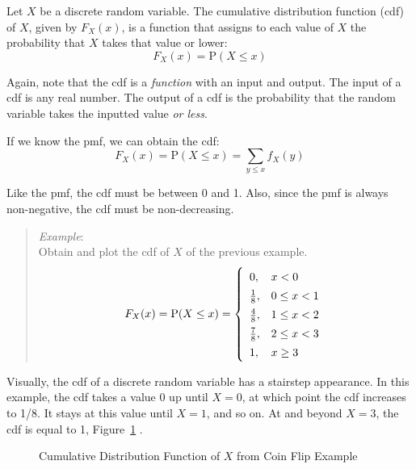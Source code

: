 \documentclass[
  letterpaper,
  DIV=11,
  numbers=noendperiod]{scrreprt}
\begin{document}
Let \(X\) be a discrete random variable. The cumulative distribution
function (cdf) of \(X\), given by \(F_X(x)\), is a function that assigns
to each value of \(X\) the probability that \(X\) takes that value or
lower: \[
F_X(x)=\mbox{P}(X\leq x)
\]

Again, note that the cdf is a \emph{function} with an input and output.
The input of a cdf is any real number. The output of a cdf is the
probability that the random variable takes the inputted value \emph{or
less}.

If we know the pmf, we can obtain the cdf: \[
F_X(x)=\mbox{P}(X\leq x)=\sum_{y\leq x} f_X(y)
\]

Like the pmf, the cdf must be between 0 and 1. Also, since the pmf is
always non-negative, the cdf must be non-decreasing.

\begin{quote}
\emph{Example}:\\
Obtain and plot the cdf of \(X\) of the previous example. \[
F_X(x)=\mbox{P}(X\leq x)=\left\{\renewcommand{\arraystretch}{1.4} \begin{array}{ll} 0, & x <0 \\
\frac{1}{8}, & 0\leq x < 1 \\
\frac{4}{8}, & 1\leq x < 2 \\
\frac{7}{8}, & 2\leq x < 3 \\
1, & x\geq 3 \end{array}\right .
\]
\end{quote}

Visually, the cdf of a discrete random variable has a stairstep
appearance. In this example, the cdf takes a value 0 up until \(X=0\),
at which point the cdf increases to 1/8. It stays at this value until
\(X=1\), and so on. At and beyond \(X=3\), the cdf is equal to 1,
Figure~\ref{fig-cdf101} .

\begin{figure}


\caption{\label{fig-cdf101}Cumulative Distribution Function of \(X\)
from Coin Flip Example}

\end{figure}%
\end{document}
